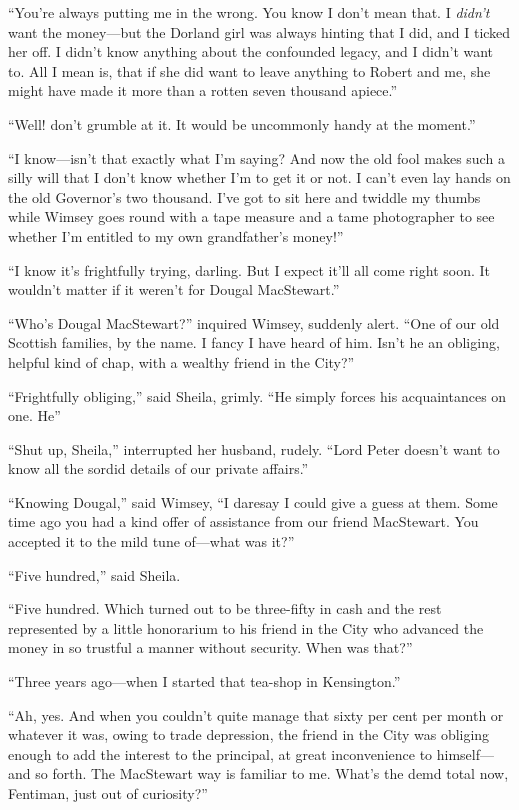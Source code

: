 \enquote{You're always putting me in the wrong. You know I don't mean that. I \textit{didn't} want the money\allowbreak---\allowbreak but the Dorland girl was always hinting that I did, and I ticked her off. I didn't know anything about the confounded legacy, and I didn't want to. All I mean is, that if she did want to leave anything to Robert and me, she might have made it more than a rotten seven thousand apiece.}

\enquote{Well! don't grumble at it. It would be uncommonly handy at the moment.}

\enquote{I know\allowbreak---\allowbreak isn't that exactly what I'm saying? And now the old fool makes such a silly will that I don't know whether I'm to get it or not. I can't even lay hands on the old Governor's two thousand. I've got to sit here and twiddle my thumbs while Wimsey goes round with a tape measure and a tame photographer to see whether I'm entitled to my own grandfather's money!}

\enquote{I know it's frightfully trying, darling. But I expect it'll all come right soon. It wouldn't matter if it weren't for Dougal MacStewart.}

\enquote{Who's Dougal MacStewart?} inquired Wimsey, suddenly alert. \enquote{One of our old Scottish families, by the name. I fancy I have heard of him. Isn't he an obliging, helpful kind of chap, with a wealthy friend in the City?}

\enquote{Frightfully obliging,} said Sheila, grimly. \enquote{He simply forces his acquaintances on one. He\longdash}

\enquote{Shut up, Sheila,} interrupted her husband, rudely. \enquote{Lord Peter doesn't want to know all the sordid details of our private affairs.}

\enquote{Knowing Dougal,} said Wimsey, \enquote{I daresay I could give a guess at them. Some time ago you had a kind offer of assistance from our friend MacStewart. You accepted it to the mild tune of\allowbreak---\allowbreak what was it?}

\enquote{Five hundred,} said Sheila.

\enquote{Five hundred. Which turned out to be three-fifty in cash and the rest represented by a little honorarium to his friend in the City who advanced the money in so trustful a manner without security. When was that?}

\enquote{Three years ago\allowbreak---\allowbreak when I started that tea-shop in Kensington.}

\enquote{Ah, yes. And when you couldn't quite manage that sixty per cent per month or whatever it was, owing to trade depression, the friend in the City was obliging enough to add the interest to the principal, at great inconvenience to himself\allowbreak---\allowbreak and so forth. The MacStewart way is familiar to me. What's the demd total now, Fentiman, just out of curiosity?}

